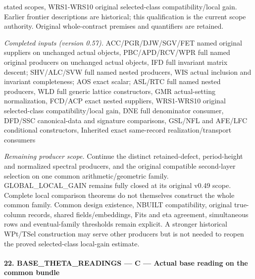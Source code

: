 \documentclass[11pt,a4paper]{article}
\numberwithin{equation}{section}
\theoremstyle{remark}\newtheorem{remark}[theorem]{Remark}
\begin{document}
stated scopes, WRS1-WRS10 original selected-class compatibility/local gain. Earlier frontier descriptions are historical; this qualification is the current scope authority. Original whole-contract premises and quantifiers are retained.

\emph{Completed inputs (version 0.57).} ACC/PGR/DJW/SGV/FET named original suppliers on unchanged actual objects, PBC/APD/RCV/WPR full named original producers on unchanged actual objects, IFD full invariant matrix descent; SHV/ALC/SVW full named nested producers, WIS actual inclusion and invariant completeness; AOS exact scalar; ASL/RTC full named nested producers, WLD full generic lattice constructors, GMR actual-setting normalization, FCD/ACP exact nested suppliers, WRS1-WRS10 original selected-class compatibility/local gain, DNE full denominator consumer, DFD/SSC canonical-data and signature comparisons, GSL/NFL and AFE/LFC conditional constructors, Inherited exact same-record realization/transport consumers

\emph{Remaining producer scope.} Continue the distinct retained-defect, period-height and normalized spectral producers, and the original compatible second-layer selection on one common arithmetic/geometric family. GLOBAL\_\allowbreak LOCAL\_\allowbreak GAIN remains fully closed at its original v0.49 scope. Complete local comparison theorems do not themselves construct the whole common family. Common design existence, NBUILT compatibility, original true-column records, shared fields/embeddings, Fits and eta agreement, simultaneous rows and eventual-family thresholds remain explicit. A stronger historical WPt/TSel construction may serve other producers but is not needed to reopen the proved selected-class local-gain estimate.



\paragraph{22. BASE\_\allowbreak THETA\_\allowbreak READINGS — C — Actual base reading on the common bundle}
\end{document}
